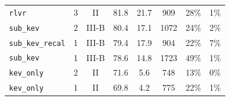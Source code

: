 \begin{tabular}{@{}lccccccc@{}}
\quad \texttt{rlvr} & 3 & II & 81.8 & 21.7 & 909 & 28\% & 1\% \\
\quad \texttt{sub\_kev} & 2 & III-B & 80.4 & 17.1 & 1072 & 24\% & 2\% \\
\quad \texttt{sub\_kev\_recal} & 1 & III-B & 79.4 & 17.9 & 904 & 22\% & 7\% \\
\quad \texttt{sub\_kev} & 1 & III-B & 78.6 & 14.8 & 1723 & 49\% & 1\% \\
\quad \texttt{kev\_only} & 2 & II & 71.6 & 5.6 & 748 & 13\% & 0\% \\
\quad \texttt{kev\_only} & 1 & II & 69.8 & 4.2 & 775 & 22\% & 1\% \\
\bottomrule
\end{tabular}
